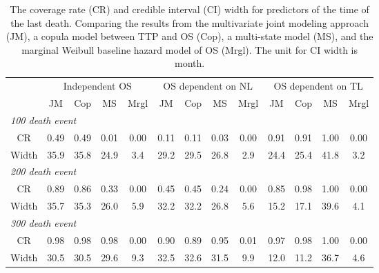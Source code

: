 \documentclass[12pt]{article}
\begin{document}
\begin{table}
\caption{The coverage rate (CR) and credible interval (CI) width for predictors of the time of the last death. Comparing the results from the multivariate joint modeling approach (JM), a copula model between TTP and OS (Cop), a multi-state model (MS), and the marginal Weibull baseline hazard model of OS (Mrgl). The unit for CI width is month.  \label{tab:sim_result}}
\begin{center}
\begin{tabular}{ccccccccccccc}
& \multicolumn{4}{c}{Independent OS} & \multicolumn{4}{c}{OS dependent on NL} & \multicolumn{4}{c}{OS dependent on TL} \\ 
& JM & Cop & MS & Mrgl & JM & Cop & MS & Mrgl & JM & Cop & MS & Mrgl \\ \hline
\multicolumn{10}{l}{\textit{100 death event}}\\
CR & 0.49 & 0.49 & 0.01 & 0.00 & 0.11 & 0.11 & 0.03 & 0.00 &  0.91 & 0.91 & 1.00 & 0.00 \\ 
Width & 35.9 & 35.8 & 24.9 & 3.4  & 29.2 & 29.5 & 26.8 & 2.9  &  24.4 & 25.4 & 41.8 & 3.2 \\ \hline
\multicolumn{10}{l}{\textit{200 death event}}\\
CR & 0.89 & 0.86 & 0.33 & 0.00 & 0.45 & 0.45 & 0.24 & 0.00 & 0.85 & 0.98 & 1.00 & 0.00 \\ 
Width & 35.7 & 35.3 & 26.0 & 5.9 & 32.2 & 32.2 & 26.8 & 5.6 & 15.2 & 17.1 & 39.6 & 4.1  \\ \hline
\multicolumn{10}{l}{\textit{300 death event}}\\
CR & 0.98 & 0.98 & 0.98 & 0.00 & 0.90 & 0.89 &  0.95 & 0.01  & 0.97 & 0.98 & 1.00 & 0.00 \\ 
Width & 30.5 & 30.5 & 29.6 & 9.3 & 32.5 & 32.6 & 31.5 & 9.9 & 12.0 & 11.2 & 36.7 & 4.6 \\ 
\hline
\end{tabular}
\end{center}
\end{table}
\end{document}
